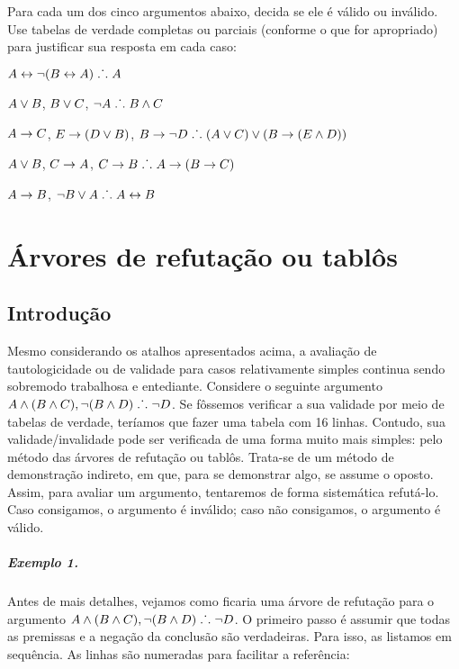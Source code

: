 \noindent\problempart Para cada um dos cinco argumentos abaixo, decida se ele é válido ou inválido.
Use tabelas de verdade completas ou parciais (conforme o que for apropriado) para justificar sua resposta em cada caso:
\label{pr.TT.valid6} 
\begin{earg}
\item $A\leftrightarrow\neg(B\leftrightarrow A)\mathrel{\ldotp\dot{}\,\ldotp} A$ %
\item $A\vee B$, $B\vee C$, $\neg A\mathrel{\ldotp\dot{}\,\ldotp} B \wedge C$ %
\item $A \rightarrow C$, $E \rightarrow (D \vee B)$, $B \rightarrow \neg D\mathrel{\ldotp\dot{}\,\ldotp} (A \vee C) \vee (B \rightarrow (E \wedge D))$ %
\item $A \vee B$, $C \rightarrow A$, $C \rightarrow B\mathrel{\ldotp\dot{}\,\ldotp} A \rightarrow (B \rightarrow C)$ %
\item $A \rightarrow B$, $\neg B \vee A\mathrel{\ldotp\dot{}\,\ldotp} A \leftrightarrow B$ %
\end{earg}



\chapter{Árvores de refutação ou tablôs}\label{s:TruthTrees}


\section{Introdução}

Mesmo considerando os atalhos apresentados acima, a avaliação de tautologicidade ou de validade  para casos relativamente simples continua sendo sobremodo trabalhosa e entediante.
Considere o seguinte argumento  $A \wedge (B \wedge C), \neg(B \wedge D) \mathrel{\ldotp\dot{}\,\ldotp} \neg D$. 
Se fôssemos verificar a sua validade por meio de tabelas de verdade, teríamos que fazer uma tabela com 16 linhas. 
Contudo, sua validade/invalidade pode ser verificada de uma forma muito mais simples: pelo método das árvores de refutação ou tablôs. 
Trata-se de um método de demonstração indireto, em que, para se demonstrar algo, se assume o oposto.
Assim, para avaliar um argumento, tentaremos de forma sistemática refutá-lo.
Caso consigamos, o argumento é inválido; caso não consigamos, o argumento é válido. 

\paragraph{Exemplo 1.}

Antes de mais detalhes, vejamos como ficaria uma árvore de refutação para o argumento  $A \wedge (B \wedge C), \neg(B \wedge D) \mathrel{\ldotp\dot{}\,\ldotp} \neg D$.
O primeiro passo é assumir que todas as premissas e a negação da conclusão são verdadeiras. 
Para isso, as listamos em sequência.
As linhas são numeradas para facilitar a referência:

